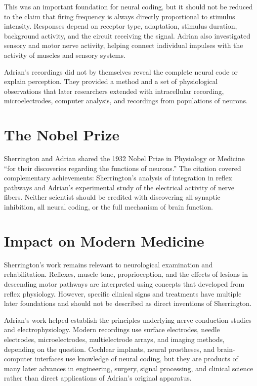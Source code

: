 This was an important foundation for neural coding, but it should not be reduced to the claim that firing frequency is always directly proportional to stimulus intensity. Responses depend on receptor type, adaptation, stimulus duration, background activity, and the circuit receiving the signal. Adrian also investigated sensory and motor nerve activity, helping connect individual impulses with the activity of muscles and sensory systems.

Adrian's recordings did not by themselves reveal the complete neural code or explain perception. They provided a method and a set of physiological observations that later researchers extended with intracellular recording, microelectrodes, computer analysis, and recordings from populations of neurons.

\section{The Nobel Prize}

Sherrington and Adrian shared the 1932 Nobel Prize in Physiology or Medicine ``for their discoveries regarding the functions of neurons.'' The citation covered complementary achievements: Sherrington's analysis of integration in reflex pathways and Adrian's experimental study of the electrical activity of nerve fibers. Neither scientist should be credited with discovering all synaptic inhibition, all neural coding, or the full mechanism of brain function.

\section{Impact on Modern Medicine}

Sherrington's work remains relevant to neurological examination and rehabilitation. Reflexes, muscle tone, proprioception, and the effects of lesions in descending motor pathways are interpreted using concepts that developed from reflex physiology. However, specific clinical signs and treatments have multiple later foundations and should not be described as direct inventions of Sherrington.

Adrian's work helped establish the principles underlying nerve-conduction studies and electrophysiology. Modern recordings use surface electrodes, needle electrodes, microelectrodes, multielectrode arrays, and imaging methods, depending on the question. Cochlear implants, neural prostheses, and brain-computer interfaces use knowledge of neural coding, but they are products of many later advances in engineering, surgery, signal processing, and clinical science rather than direct applications of Adrian's original apparatus.


